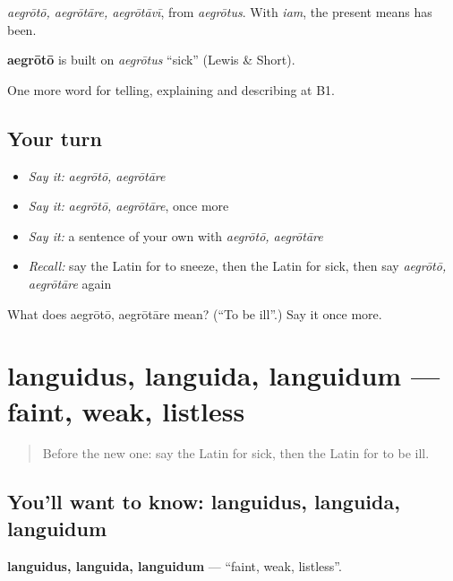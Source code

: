 \emph{aegrōtō, aegrōtāre, aegrōtāvī}, from \emph{aegrōtus}. With \emph{iam}, the present means has been.

\begin{cousinweb}
\textbf{aegrōtō} is built on \emph{aegrōtus} \textquotedblleft{}sick\textquotedblright{} (Lewis \& Short).
\end{cousinweb}

\begin{grammarlens}[title={What you've built}]
One more word for telling, explaining and describing at B1.
\end{grammarlens}

\subsection*{Your turn}
\begin{itemize}
\raggedright
  \item \emph{Say it:} \emph{aegrōtō, aegrōtāre}
  \item \emph{Say it:} \emph{aegrōtō, aegrōtāre}, once more
  \item \emph{Say it:} a sentence of your own with \emph{aegrōtō, aegrōtāre}
  \item \emph{Recall:} say the Latin for to sneeze, then the Latin for sick, then say \emph{aegrōtō, aegrōtāre} again
\end{itemize}

\begin{tcolorbox}[breakable,colback=teal!4,colframe=teal!35!black,title={Before you move on}]
What does aegrōtō, aegrōtāre mean? (\textquotedblleft{}To be ill\textquotedblright{}.) Say it once more.
\end{tcolorbox}
\section[languidus, languida, languidum]{languidus, languida, languidum — faint, weak, listless}

\label{lesson:LA-C521-languidus}



\begin{quote}
Before the new one: say the Latin for sick, then the Latin for to be ill.
\end{quote}

\subsection*{You'll want to know: languidus, languida, languidum}
\textbf{languidus, languida, languidum} — \textquotedblleft{}faint, weak, listless\textquotedblright{}.

